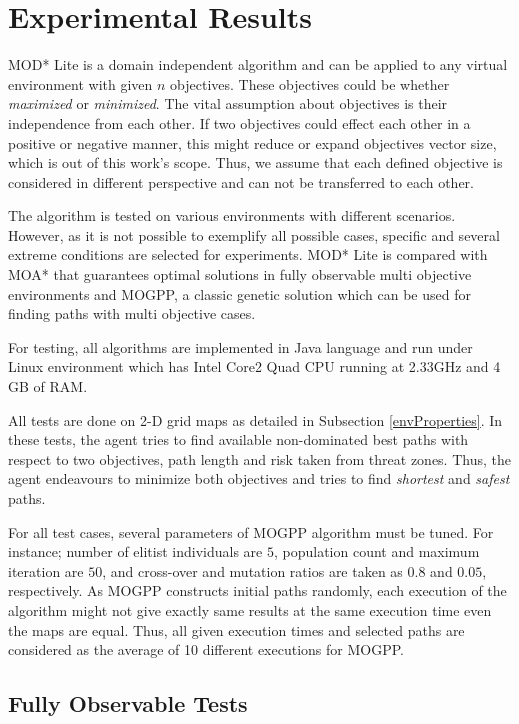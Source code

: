\chapter{Experimental Results}
\label{chapter:experiments}

MOD* Lite is a domain independent algorithm and can be applied to any virtual environment with given $n$ objectives. These objectives could be whether \textit{maximized} or \textit{minimized}. The vital assumption about objectives is their independence from each other. If two objectives could effect each other in a positive or negative manner, this might reduce or expand objectives vector size, which is out of this work's scope. Thus, we assume that each defined objective is considered in different perspective and can not be transferred to each other.

The algorithm is tested on various environments with different scenarios. However, as it is not possible to exemplify all possible cases, specific and several extreme conditions are selected for experiments. MOD* Lite is compared with MOA* that guarantees optimal solutions in fully observable multi objective environments and MOGPP, a classic genetic solution which can be used for finding paths with multi objective cases.

For testing, all algorithms are implemented in Java language and run under Linux environment which has Intel Core2 Quad CPU running at 2.33GHz and 4 GB of RAM.

All tests are done on 2-D grid maps as detailed in Subsection \ref{envProperties}. In these tests, the agent tries to find available non-dominated best paths with respect to two objectives, path length and risk taken from threat zones. Thus, the agent endeavours to minimize both objectives and tries to find \textit{shortest} and \textit{safest} paths.

For all test cases, several parameters of MOGPP algorithm must be tuned. For instance; number of elitist individuals are $5$, population count and maximum iteration are $50$, and cross-over and mutation ratios are taken as $0.8$ and $0.05$, respectively. As MOGPP constructs initial paths randomly, each execution of the algorithm might not give exactly same results at the same execution time even the maps are equal. Thus, all given execution times and selected paths are considered as the average of 10 different executions for MOGPP.

\section{Fully Observable Tests}

